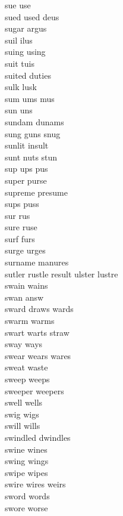 sue use\\
sued used deus\\
sugar argus\\
suil ilus\\
suing using\\
suit tuis\\
suited duties\\
sulk lusk\\
sum ums mus\\
sun uns\\
sundam dunams\\
sung guns snug\\
sunlit insult\\
sunt nuts stun\\
sup ups pus\\
super purse\\
supreme presume\\
sups puss\\
sur rus\\
sure ruse\\
surf furs\\
surge urges\\
surname manures\\
sutler rustle result ulster lustre\\
swain wains\\
swan answ\\
sward draws wards\\
swarm warms\\
swart warts straw\\
sway ways\\
swear wears wares\\
sweat waste\\
sweep weeps\\
sweeper weepers\\
swell wells\\
swig wigs\\
swill wills\\
swindled dwindles\\
swine wines\\
swing wings\\
swipe wipes\\
swire wires weirs\\
sword words\\
swore worse\\

